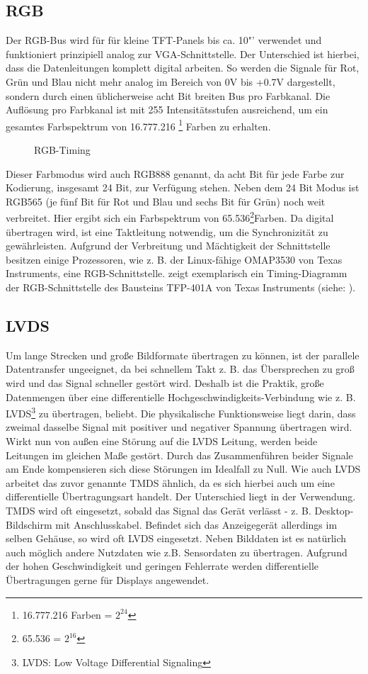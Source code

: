\subsection{RGB}
Der RGB-Bus wird für für kleine TFT-Panels bis ca. 10"' verwendet und funktioniert prinzipiell analog zur VGA-Schnittstelle. Der Unterschied ist hierbei, dass die Datenleitungen komplett digital arbeiten. So werden die Signale für Rot, Grün und Blau nicht mehr analog im Bereich von 0V bis +0.7V dargestellt, sondern durch einen üblicherweise acht Bit breiten Bus pro Farbkanal. Die Auflösung pro Farbkanal ist mit 255 Intensitätsstufen ausreichend, um ein gesamtes Farbspektrum von 16.777.216 \footnote{16.777.216 Farben = $2^{24}$} Farben zu erhalten. 
\begin{figure}[htp]
	\centering
{}
	\caption{RGB-Timing}
	\label{fig:rgb_timing}
\end{figure}
Dieser Farbmodus wird auch RGB888 genannt, da acht Bit für jede Farbe zur Kodierung, insgesamt 24 Bit, zur Verfügung stehen. Neben dem 24 Bit Modus ist RGB565 (je fünf Bit für Rot und Blau und sechs Bit für Grün) noch weit verbreitet. Hier ergibt sich ein Farbspektrum von 65.536\footnote{65.536 = $2^{16}$}Farben. Da digital übertragen wird, ist eine Taktleitung notwendig, um die Synchronizität zu gewährleisten. 
Aufgrund der Verbreitung und Mächtigkeit der Schnittstelle besitzen einige Prozessoren, wie z. B. der Linux-fähige OMAP3530 von Texas Instruments, eine RGB-Schnittstelle. 
 zeigt exemplarisch ein Timing-Diagramm der RGB-Schnittstelle des Bausteins TFP-401A von Texas Instruments (siehe: \cite{TI2011}).
\subsection{LVDS}
Um lange Strecken und große Bildformate übertragen zu können, ist der parallele Datentransfer ungeeignet, da bei schnellem Takt z. B. das Übersprechen zu groß wird und das Signal schneller gestört wird. Deshalb ist die Praktik, große Datenmengen über eine differentielle Hochgeschwindigkeits-Verbindung wie z. B. LVDS\footnote{LVDS: Low Voltage Differential Signaling} zu übertragen, beliebt. Die physikalische Funktionsweise liegt darin, dass zweimal dasselbe Signal mit positiver und negativer Spannung übertragen wird. Wirkt nun von außen eine Störung auf die LVDS Leitung, werden beide Leitungen im gleichen Maße gestört. Durch das Zusammenführen beider Signale am Ende kompensieren sich diese Störungen im Idealfall zu Null. Wie auch LVDS arbeitet das zuvor genannte TMDS ähnlich, da es sich hierbei auch um eine differentielle Übertragungsart handelt. Der Unterschied liegt in der Verwendung. TMDS wird oft eingesetzt, sobald das Signal das Gerät verlässt - z. B. Desktop-Bildschirm mit Anschlusskabel. Befindet sich das Anzeigegerät allerdings im selben Gehäuse, so wird oft LVDS eingesetzt. Neben Bilddaten ist es natürlich auch möglich andere Nutzdaten wie z.B. Sensordaten zu übertragen. 
Aufgrund der hohen Geschwindigkeit und geringen Fehlerrate werden differentielle Übertragungen gerne für Displays angewendet.
